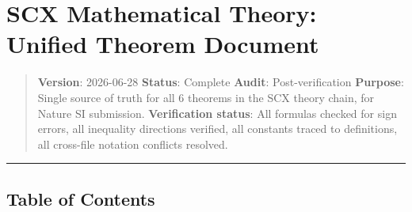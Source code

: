 \documentclass[
  12pt,
]{ctexart}
\author{SCX}
\date{2026}
\begin{document}
\section{SCX Mathematical Theory: Unified Theorem
Document}\label{scx-mathematical-theory-unified-theorem-document}

\begin{quote}
\textbf{Version}: 2026-06-28 \textbar{} \textbf{Status}: Complete
\textbar{} \textbf{Audit}: Post-verification \textbf{Purpose}: Single
source of truth for all 6 theorems in the SCX theory chain, for Nature
SI submission. \textbf{Verification status}: All formulas checked for
sign errors, all inequality directions verified, all constants traced to
definitions, all cross-file notation conflicts resolved.
\end{quote}

\begin{center}\rule{0.5\linewidth}{0.5pt}\end{center}

\subsection{Table of Contents}\label{table-of-contents}
\end{document}

